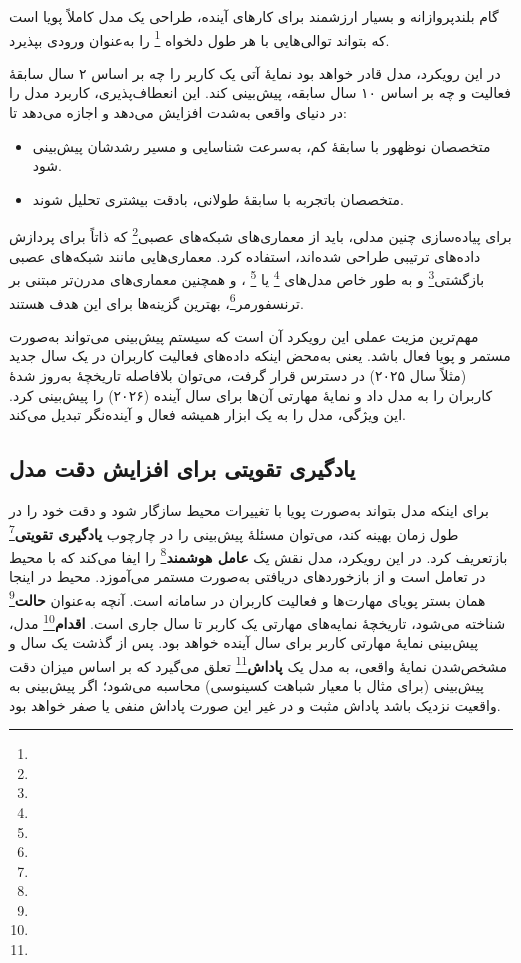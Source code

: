گام بلندپروازانه و بسیار ارزشمند برای کارهای آینده، طراحی یک مدل کاملاً پویا است که بتواند توالی‌هایی با هر طول دلخواه \footnote{} را به‌عنوان ورودی بپذیرد.

در این رویکرد، مدل قادر خواهد بود نمایهٔ آتی یک کاربر را چه بر اساس ۲ سال سابقهٔ فعالیت و چه بر اساس ۱۰ سال سابقه، پیش‌بینی کند. این انعطاف‌پذیری، کاربرد مدل را در دنیای واقعی به‌شدت افزایش می‌دهد و اجازه می‌دهد تا: 

\begin{itemize}
   \item متخصصان نوظهور با سابقهٔ کم، به‌سرعت شناسایی و مسیر رشدشان پیش‌بینی شود.
   \item متخصصان باتجربه با سابقهٔ طولانی، بادقت بیشتری تحلیل شوند.
\end{itemize}
برای پیاده‌سازی چنین مدلی، باید از معماری‌های شبکه‌های عصبی\footnote{} که ذاتاً برای پردازش داده‌های ترتیبی طراحی شده‌اند، استفاده کرد. معماری‌هایی مانند شبکه‌های عصبی بازگشتی\footnote{} و به طور خاص مدل‌های \footnote{} یا \footnote{}
، و همچنین معماری‌های مدرن‌تر مبتنی بر ترنسفورمر\footnote{}، بهترین گزینه‌ها برای این هدف هستند.

مهم‌ترین مزیت عملی این رویکرد آن است که سیستم پیش‌بینی می‌تواند به‌صورت مستمر و پویا فعال باشد. یعنی به‌محض اینکه داده‌های فعالیت کاربران در یک سال جدید (مثلاً سال ۲۰۲۵) در دسترس قرار گرفت، می‌توان بلافاصله تاریخچهٔ به‌روز شدهٔ کاربران را به مدل داد و نمایهٔ مهارتی آن‌ها برای سال آینده (۲۰۲۶) را پیش‌بینی کرد. این ویژگی، مدل را به یک ابزار همیشه فعال و آینده‌نگر تبدیل می‌کند.

\subsection{یادگیری تقویتی برای افزایش دقت مدل}
برای اینکه مدل بتواند به‌صورت پویا با تغییرات محیط سازگار شود و دقت خود را در طول زمان بهینه کند، می‌توان مسئلهٔ پیش‌بینی را در چارچوب \textbf{یادگیری تقویتی}\footnote{} بازتعریف کرد. در این رویکرد، مدل نقش یک \textbf{عامل هوشمند}\footnote{} را ایفا می‌کند که با محیط در تعامل است و از بازخوردهای دریافتی به‌صورت مستمر می‌آموزد. محیط در اینجا همان بستر پویای مهارت‌ها و فعالیت کاربران در سامانه است. آنچه به‌عنوان \textbf{حالت}\footnote{} شناخته می‌شود، تاریخچهٔ نمایه‌های مهارتی یک کاربر تا سال جاری است. \textbf{اقدام}\footnote{} مدل، پیش‌بینی نمایهٔ مهارتی کاربر برای سال آینده خواهد بود. پس از گذشت یک سال و مشخص‌شدن نمایهٔ واقعی، به مدل یک \textbf{پاداش}\footnote{} تعلق می‌گیرد که بر اساس میزان دقت پیش‌بینی (برای مثال با معیار شباهت کسینوسی) محاسبه می‌شود؛ اگر پیش‌بینی به واقعیت نزدیک باشد پاداش مثبت و در غیر این صورت پاداش منفی یا صفر خواهد بود.

